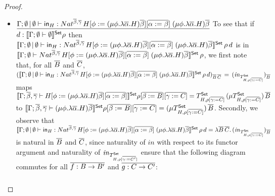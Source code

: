 \documentclass[acmsmall,review,anonymous]{acmart}
\theoremstyle{definition}
\newcommand{\set}{\mathsf{Set}}
\begin{document}
\begin{proof}
\begin{itemize}
\item
$\underline{\Gamma;\emptyset \,|\, \emptyset \vdash \mathsf{in}_H :
  Nat^{\overline{\beta},\overline{\gamma}} \, H[\phi := (\mu \phi.\lambda
    {\overline \alpha}.H){\overline \beta}][\overline{\alpha := \beta}]
  \;(\mu \phi.\lambda {\overline \alpha}.H){\overline \beta}}$\; To
  see that if $d : \setsem{\Gamma;\emptyset \vdash \emptyset} \rho$
  then $\setsem{\Gamma;\emptyset \,|\, \emptyset \vdash \tin_H :
    Nat^{\ol{\beta},\ol{\gamma}} \, H[\phi := (\mu \phi.\lambda
      {\overline \alpha}.H){\overline \beta}][\ol{\alpha := \beta}]
    \;(\mu \phi.\lambda {\overline \alpha}.H){\overline \beta}}\,
  \rho\,d$ is in\\ $\setsem{\Gamma;\emptyset \vdash
    Nat^{\ol{\beta},\ol{\gamma}} \, H[\phi := (\mu \phi.\lambda
      {\overline \alpha}.H){\overline \beta}][\ol{\alpha := \beta}]
    \;(\mu \phi.\lambda {\overline \alpha}.H){\overline \beta}}\,
  \rho$, we first note that, for all $\overline{B}$ and $\overline{C}$,
  $(\setsem{\Gamma;\emptyset \,|\, \emptyset \vdash \tin_H :
    Nat^{\ol{\beta},\ol{\gamma}} \, H[\phi := (\mu \phi.\lambda
      {\overline \alpha}.H){\overline \beta}][\ol{\alpha := \beta}]
    \;(\mu \phi.\lambda {\overline \alpha}.H){\overline \beta}}\,
  \rho\,d)_{\ol{B}\,\ol{C}}\, =\,
  (\mathit{in}_{T^\set_{H,\rho[\ol{\gamma := C}]}})_{\ol{B}}$ maps
  $\setsem{\Gamma;\ol{\beta},\ol{\gamma} \vdash H[\phi := (\mu
      \phi.\lambda {\overline \alpha}.H){\overline \beta}][\ol{\alpha
        := \beta}]}\rho[\ol{\beta := B}][\ol{\gamma := C}] =
  T^\set_{H,\rho[\ol{\gamma := C}]}\, (\mu T^\set_{H,\rho[\ol{\gamma
        := C}]}) \, \ol{B}$ to $\setsem{\Gamma;\ol{\beta},\ol{\gamma}
    \vdash (\mu \phi.\lambda {\overline \alpha}.H){\overline \beta}}
  \rho[\ol{\beta := B}][\ol{\gamma := C}] = (\mu
  T^\set_{H,\rho[\ol{\gamma := C}]}) \, \ol{B}$. Secondly, we observe
  that\\ $\setsem{\Gamma;\emptyset \,|\, \emptyset \vdash \tin_H :
    Nat^{\ol{\beta},\ol{\gamma}} \, H[\phi := (\mu \phi.\lambda
      {\overline \alpha}.H){\overline \beta}][\ol{\alpha := \beta}]
    \;(\mu \phi.\lambda {\overline \alpha}.H){\overline
      \beta}}\,\rho\,d = \lambda
  \ol{B}\,\ol{C}.\,(\mathit{in}_{T^\set_{H,\rho[\ol{\gamma :=
          C}]}})_{\ol{B}}$ is natural in $\overline{B}$ and $\overline{C}$, since
  naturality of $\mathit{in}$ with respect to its functor argument and
  naturality of $\mathit{in}_{T^\set_{H,\rho[\ol{\gamma := C'}]}}$ ensure
  that the following diagram commutes for all $\overline{f : B \to B'}$ and
  $\overline{g : C \to C'}$:
{\tiny
  \[\begin{tikzcd}[column sep=2.5in, row sep=0.75in]

\end{tikzcd}\]}
\end{itemize}
\end{proof}
\end{document}
